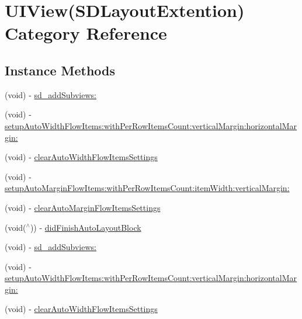 \hypertarget{category_u_i_view_07_s_d_layout_extention_08}{}\section{U\+I\+View(S\+D\+Layout\+Extention) Category Reference}
\label{category_u_i_view_07_s_d_layout_extention_08}
\subsection*{Instance Methods}
\begin{DoxyCompactItemize}
\item 
(void) -\/ \mbox{\hyperlink{category_u_i_view_07_s_d_layout_extention_08_a9da7e7a372beaee62a711b5b4d2ac914}{sd\+\_\+add\+Subviews\+:}}
\item 
(void) -\/ \mbox{\hyperlink{category_u_i_view_07_s_d_layout_extention_08_acf79adf5d8aee91802214b32de9bc6ec}{setup\+Auto\+Width\+Flow\+Items\+:with\+Per\+Row\+Items\+Count\+:vertical\+Margin\+:horizontal\+Margin\+:}}
\item 
(void) -\/ \mbox{\hyperlink{category_u_i_view_07_s_d_layout_extention_08_a888e0557fd4afaa936940bc459f1f500}{clear\+Auto\+Width\+Flow\+Items\+Settings}}
\item 
(void) -\/ \mbox{\hyperlink{category_u_i_view_07_s_d_layout_extention_08_a57788eaf9c49da742925370164ba5702}{setup\+Auto\+Margin\+Flow\+Items\+:with\+Per\+Row\+Items\+Count\+:item\+Width\+:vertical\+Margin\+:}}
\item 
(void) -\/ \mbox{\hyperlink{category_u_i_view_07_s_d_layout_extention_08_adc46f9c2b4fafbd42548e94d25921ccf}{clear\+Auto\+Margin\+Flow\+Items\+Settings}}
\item 
(void($^\wedge$)) -\/ \mbox{\hyperlink{category_u_i_view_07_s_d_layout_extention_08_a331d5c017fd41aff38a84708524f857d}{did\+Finish\+Auto\+Layout\+Block}}
\item 
(void) -\/ \mbox{\hyperlink{category_u_i_view_07_s_d_layout_extention_08_a9da7e7a372beaee62a711b5b4d2ac914}{sd\+\_\+add\+Subviews\+:}}
\item 
(void) -\/ \mbox{\hyperlink{category_u_i_view_07_s_d_layout_extention_08_acf79adf5d8aee91802214b32de9bc6ec}{setup\+Auto\+Width\+Flow\+Items\+:with\+Per\+Row\+Items\+Count\+:vertical\+Margin\+:horizontal\+Margin\+:}}
\item 
(void) -\/ \mbox{\hyperlink{category_u_i_view_07_s_d_layout_extention_08_a888e0557fd4afaa936940bc459f1f500}{clear\+Auto\+Width\+Flow\+Items\+Settings}}

\end{DoxyCompactItemize}
